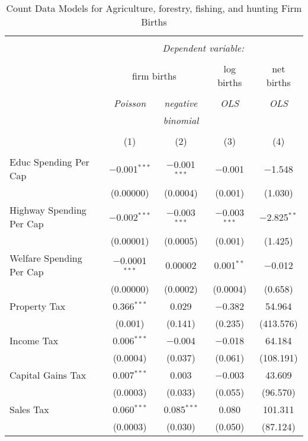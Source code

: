 
\begin{table}[!htbp] \centering 
  \caption{Count Data Models for Agriculture, forestry, fishing, and hunting Firm Births} 
  \label{} 
\begin{tabular}{@{\extracolsep{5pt}}lcccc} 
\\[-1.8ex]\hline 
\hline \\[-1.8ex] 
 & \multicolumn{4}{c}{\textit{Dependent variable:}} \\ 
\cline{2-5} 
\\[-1.8ex] & \multicolumn{2}{c}{firm births} & log births & net births \\ 
\\[-1.8ex] & \textit{Poisson} & \textit{negative} & \textit{OLS} & \textit{OLS} \\ 
 & \textit{} & \textit{binomial} & \textit{} & \textit{} \\ 
\\[-1.8ex] & (1) & (2) & (3) & (4)\\ 
\hline \\[-1.8ex] 
 Educ Spending Per Cap & $-$0.001$^{***}$ & $-$0.001$^{***}$ & $-$0.001 & $-$1.548 \\ 
  & (0.00000) & (0.0004) & (0.001) & (1.030) \\ 
  Highway Spending Per Cap  & $-$0.002$^{***}$ & $-$0.003$^{***}$ & $-$0.003$^{***}$ & $-$2.825$^{**}$ \\ 
  & (0.00001) & (0.0005) & (0.001) & (1.425) \\ 
  Welfare Spending Per Cap  & $-$0.0001$^{***}$ & 0.00002 & 0.001$^{**}$ & $-$0.012 \\ 
  & (0.00000) & (0.0002) & (0.0004) & (0.658) \\ 
  Property Tax & 0.366$^{***}$ & 0.029 & $-$0.382 & 54.964 \\ 
  & (0.001) & (0.141) & (0.235) & (413.576) \\ 
  Income Tax & 0.006$^{***}$ & $-$0.004 & $-$0.018 & 64.184 \\ 
  & (0.0004) & (0.037) & (0.061) & (108.191) \\ 
  Capital Gains Tax & 0.007$^{***}$ & 0.003 & $-$0.003 & 43.609 \\ 
  & (0.0003) & (0.033) & (0.055) & (96.570) \\ 
  Sales Tax & 0.060$^{***}$ & 0.085$^{***}$ & 0.080 & 101.311 \\ 
  & (0.0003) & (0.030) & (0.050) & (87.124) \\ 

\end{tabular}
\end{table}
